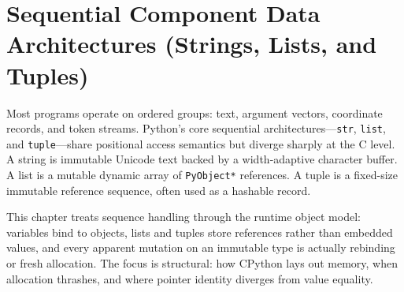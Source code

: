 \chapter{Sequential Component Data Architectures (Strings, Lists, and Tuples)}

Most programs operate on ordered groups: text, argument vectors, coordinate records, and token streams. Python's core sequential architectures---\texttt{str}, \texttt{list}, and \texttt{tuple}---share positional access semantics but diverge sharply at the C level. A string is immutable Unicode text backed by a width-adaptive character buffer. A list is a mutable dynamic array of \texttt{PyObject*} references. A tuple is a fixed-size immutable reference sequence, often used as a hashable record.

This chapter treats sequence handling through the runtime object model: variables bind to objects, lists and tuples store references rather than embedded values, and every apparent mutation on an immutable type is actually rebinding or fresh allocation. The focus is structural: how CPython lays out memory, when allocation thrashes, and where pointer identity diverges from value equality.
